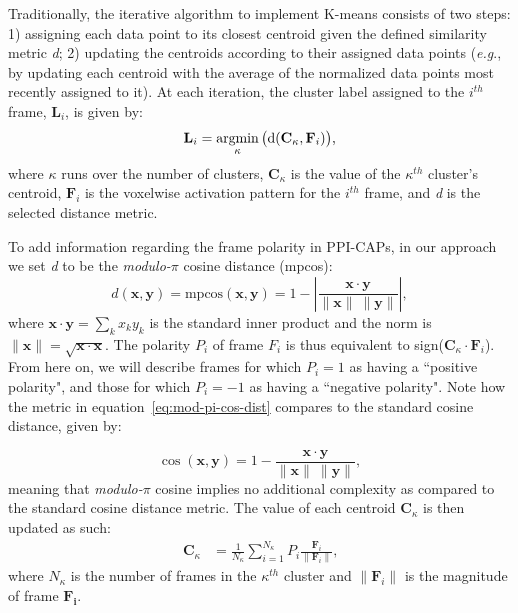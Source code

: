 Traditionally, the iterative algorithm to implement K-means consists of two steps: 1) assigning each data point to its closest centroid given the defined similarity metric \textit{d}; 2) updating the centroids according to their assigned data points (\textit{e.g}., by updating each centroid with the average of the normalized data points most recently assigned to it). At each iteration, the cluster label assigned to the $i^{th}$ frame, $\mathbf{L}_i$, is given by:
 \begin{equation} \label{eq:labelassigment}
 \mathbf{L}_i = \operatorname*{argmin}_{\kappa} \big( \text{d}( \mathbf{C}_\kappa, \mathbf{F}_i )  \big)\text{,}
 \end{equation}
 where $\kappa$ runs over the number of clusters, $\mathbf{C}_\kappa$ is the value of the $\kappa^{th}$ cluster's centroid, $\mathbf{F}_i$ is the voxelwise activation pattern for the $i^{th}$ frame, and \textit{d} is the selected distance metric.
 
 
 
 To add information regarding the frame polarity in PPI-CAPs, in our approach we set \textit{d} to be the \textit{modulo-$\pi$} cosine distance (mpcos):
 \begin{equation}
 \label{eq:mod-pi-cos-dist}
 d(\mathbf{x},\mathbf{y}) =\mathrm{mpcos}(\mathbf{x},\mathbf{y}) = 1 -  \left|  \frac{ \mathbf{x} \cdot  \mathbf{y}}{\|\mathbf{x}\| ~\|\mathbf{y}\|} \right|,
 \end{equation}
 where $  \mathbf{x} \cdot \mathbf{y} = \sum_k x_k y_k  $ is  the standard inner product and the norm is $\| \mathbf{x} \|= \sqrt{\mathbf{x} \cdot \mathbf{x}}$. The polarity $P_i$ of  frame $F_i$ is thus equivalent to sign($  \mathbf{C}_\kappa \cdot \mathbf{F}_i $). From here on, we will describe frames for which $P_i = 1$ as having a ``positive polarity", and those for which $P_i = -1$ as having a ``negative polarity". Note how the metric in equation~\eqref{eq:mod-pi-cos-dist} compares to the standard cosine distance, given by:
 
 \begin{equation}
 \cos(\mathbf{x},\mathbf{y}) = 1 -  \frac{ \mathbf{x} \cdot  \mathbf{y}}{\|\mathbf{x}\| ~\|\mathbf{y}\|} ,
 \end{equation}
meaning that \textit{modulo-$\pi$} cosine implies no additional complexity as compared to the standard cosine distance metric.
 The value of each centroid $\mathbf{C}_\kappa$ is then updated as such:
\begin{align}\label{eq:centroid}
\mathbf{C}_\kappa &= \frac{1}{N_\kappa} \sum_{i=1}^{N_\kappa} P_i \frac{\mathbf{F}_i}{\|\mathbf{F}_i\|}\text{,} 
\end{align}
where $N_\kappa$ is the number of frames in the $\kappa^{th}$ cluster and $\|\mathbf{F}_i\|$ is the magnitude of frame $\mathbf{F_i}$.

